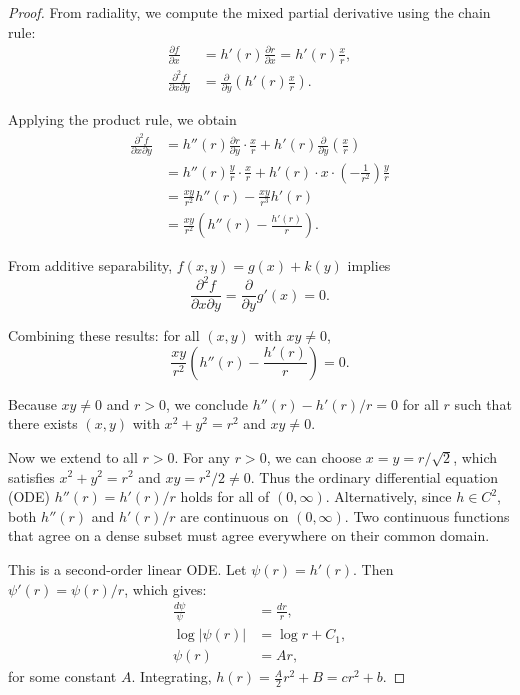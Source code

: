 \documentclass[twoside,11pt]{article}
\begin{document}
\begin{proof}
	From radiality, we compute the mixed partial derivative using the chain rule:
	\begin{align}
		\frac{\partial f}{\partial x}              & = h'(r) \frac{\partial r}{\partial x} = h'(r) \frac{x}{r},     \\
		\frac{\partial^2 f}{\partial x \partial y} & = \frac{\partial}{\partial y}\left( h'(r) \frac{x}{r} \right).
	\end{align}

	Applying the product rule, we obtain
	\begin{align}
		\frac{\partial^2 f}{\partial x \partial y} & = h''(r) \frac{\partial r}{\partial y} \cdot \frac{x}{r} + h'(r) \frac{\partial}{\partial y}\left(\frac{x}{r}\right) \\
		                                           & = h''(r) \frac{y}{r} \cdot \frac{x}{r} + h'(r) \cdot x \cdot \left(-\frac{1}{r^2}\right) \frac{y}{r}                 \\
		                                           & = \frac{xy}{r^2} h''(r) - \frac{xy}{r^3} h'(r)                                                                       \\
		                                           & = \frac{xy}{r^2} \left( h''(r) - \frac{h'(r)}{r} \right).
	\end{align}

	From additive separability, $f(x, y) = g(x) + k(y)$ implies
	\[
		\frac{\partial^2 f}{\partial x \partial y} = \frac{\partial}{\partial y} g'(x) = 0.
	\]

	Combining these results: for all $(x, y)$ with $xy \neq 0$,
	\begin{equation}
		\frac{xy}{r^2} \left( h''(r) - \frac{h'(r)}{r} \right) = 0.
		\label{eq:obstruction_ode}
	\end{equation}

	Because $xy \neq 0$ and $r > 0$, we conclude $h''(r) - h'(r)/r = 0$ for all $r$ such that there exists $(x,y)$ with $x^2 + y^2 = r^2$ and $xy \neq 0$.

	Now we extend to all $r > 0$. For any $r > 0$, we can choose $x = y = r/\sqrt{2}$, which satisfies $x^2 + y^2 = r^2$ and $xy = r^2/2 \neq 0$. Thus the ordinary differential equation (ODE) $h''(r) = h'(r)/r$ holds for all of $(0, \infty)$. Alternatively, since $h \in C^2$, both $h''(r)$ and $h'(r)/r$ are continuous on $(0, \infty)$. Two continuous functions that agree on a dense subset must agree everywhere on their common domain.

	This is a second-order linear ODE\@. Let $\psi(r) = h'(r)$. Then $\psi'(r) = \psi(r)/r$, which gives:
	\begin{align*}
		\frac{d\psi}{\psi} & = \frac{dr}{r}, \\
		\log|\psi(r)|      & = \log r + C_1, \\
		\psi(r)            & = Ar,
	\end{align*}
	for some constant $A$. Integrating, $h(r) = \frac{A}{2} r^2 + B = cr^2 + b$.
\end{proof}
\end{document}

